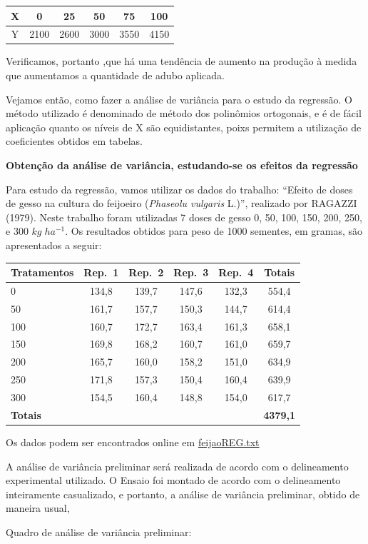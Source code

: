 \documentclass[
]{book}
\begin{document}
\begin{longtable}[]{@{}cccccc@{}}
\toprule
X & 0 & 25 & 50 & 75 & 100\tabularnewline
\midrule
\endhead
Y & 2100 & 2600 & 3000 & 3550 & 4150\tabularnewline
\bottomrule
\end{longtable}

Verificamos, portanto ,que há uma tendência de aumento na produção à medida que aumentamos a quantidade de adubo aplicada.

Vejamos então, como fazer a análise de variância para o estudo da regressão. O método utilizado é denominado de método dos polinômios ortogonais, e é de fácil aplicação quanto os níveis de X são equidistantes, poixs permitem a utilização de coeficientes obtidos em tabelas.

\textbf{Obtenção da análise de variância, estudando-se os efeitos da regressão}

Para estudo da regressão, vamos utilizar os dados do trabalho: ``Efeito de doses de gesso na cultura do feijoeiro (\emph{Phaseolu vulgaris} L.)'', realizado por RAGAZZI (1979). Neste trabalho foram utilizadas 7 doses de gesso 0, 50, 100, 150, 200, 250, e 300 \(kg\;ha^{-1}\). Os resultados obtidos para peso de 1000 sementes, em gramas, são apresentados a seguir:

\begin{longtable}[]{@{}lccccc@{}}
\toprule
Tratamentos & Rep.~1 & Rep.~2 & Rep.~3 & Rep.~4 & Totais\tabularnewline
\midrule
\endhead
0 & 134,8 & 139,7 & 147,6 & 132,3 & 554,4\tabularnewline
50 & 161,7 & 157,7 & 150,3 & 144,7 & 614,4\tabularnewline
100 & 160,7 & 172,7 & 163,4 & 161,3 & 658,1\tabularnewline
150 & 169,8 & 168,2 & 160,7 & 161,0 & 659,7\tabularnewline
200 & 165,7 & 160,0 & 158,2 & 151,0 & 634,9\tabularnewline
250 & 171,8 & 157,3 & 150,4 & 160,4 & 639,9\tabularnewline
300 & 154,5 & 160,4 & 148,8 & 154,0 & 617,7\tabularnewline
\textbf{Totais} & & & & & \textbf{4379,1}\tabularnewline
\bottomrule
\end{longtable}

Os dados podem ser encontrados online em \href{https://raw.githubusercontent.com/arpanosso/curso_GIEU/master/dados/feijaoREG.txt}{feijaoREG.txt}

A análise de variância preliminar será realizada de acordo com o delineamento experimental utilizado. O Ensaio foi montado de acordo com o delineamento inteiramente casualizado, e portanto, a análise de variância preliminar, obtido de maneira usual,

Quadro de análise de variância preliminar:
\end{document}
